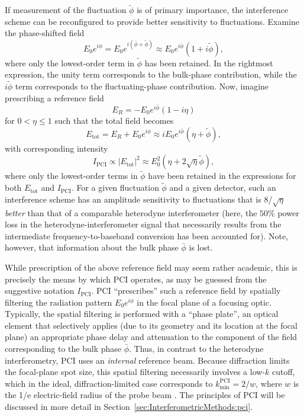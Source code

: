 If measurement of the fluctuation $\tilde{\phi}$ is of primary importance,
the interference scheme can be reconfigured
to provide better sensitivity to fluctuations.
Examine the phase-shifted field
\begin{equation}
  E_0 e^{i \phi}
  =
  E_0 e^{i \left( \bar{\phi} + \tilde{\phi} \right)}
  \approx
  E_0 e^{i \bar{\phi}} \left( 1 + i \tilde{\phi} \right),
\end{equation}
where only the lowest-order term in $\tilde{\phi}$ has been retained.
In the rightmost expression,
the unity term corresponds to the bulk-phase contribution, while
the $i \tilde{\phi}$ term corresponds to the fluctuating-phase contribution.
Now, imagine prescribing a reference field
\begin{equation}
  E_R = -E_0 e^{i \bar{\phi}} (1 - i \eta)
\end{equation}
for $0 < \eta \leq 1$ such that the total field becomes
\begin{equation}
  E_{\text{tot}}
  =
  E_R + E_0 e^{i \phi}
  \approx
  i E_0 e^{i \bar{\phi}} \left( \eta + \tilde{\phi} \right),
\end{equation}
with corresponding intensity
\begin{equation}
  I_{\text{PCI}}
  \propto
  |E_{\text{tot}}|^2
  \approx
  E_0^2 \left( \eta + 2 \sqrt{\eta} \tilde{\phi} \right),
  \label{eq:Introduction:OpticalInterferometry:PCI:intensity}
\end{equation}
where only the lowest-order terms in $\tilde{\phi}$
have been retained in the expressions
for both $E_{\text{tot}}$ and $I_{\text{PCI}}$.
For a given fluctuation $\tilde{\phi}$ and a given detector,
such an interference scheme has an amplitude sensitivity to fluctuations
that is $8 / \sqrt{\eta}$ \emph{better}
than that of a comparable heterodyne interferometer
(here, the $50\%$ power loss in the heterodyne-interferometer signal
that necessarily results from the intermediate frequency-to-baseband conversion
has been accounted for).
Note, however, that information about the bulk phase $\bar{\phi}$ is lost.

While prescription of the above reference field may seem rather academic,
this is precisely the means by which PCI operates,
as may be guessed from the suggestive notation $I_{\text{PCI}}$.
PCI ``prescribes'' such a reference field
by spatially filtering the radiation pattern $E_0 e^{i \phi}$
in the focal plane of a focusing optic.
Typically, the spatial filtering is performed with a ``phase plate'',
an optical element that selectively applies
(due to its geometry and its location at the focal plane)
an appropriate phase delay and attenuation
to the component of the field corresponding to the bulk phase $\bar{\phi}$.
Thus, in contrast to the heterodyne interferometry,
PCI uses an \emph{internal} reference beam.
Because diffraction limits the focal-plane spot size,
this spatial filtering necessarily involves a low-$k$ cutoff,
which in the ideal, diffraction-limited case corresponds to
$k_{\text{min}}^{\text{PCI}} = 2 / w$,
where $w$ is the 1/e electric-field radius of the probe beam
\cite{dorris_rsi09}.
The principles of PCI will be discussed in more detail in
Section~\ref{sec:InterferometricMethods:pci}.

